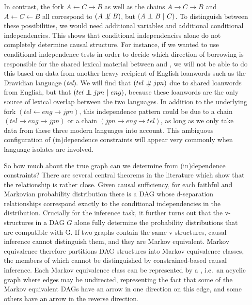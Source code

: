 In contrast, the fork $A \leftarrow C \rightarrow B$ as well as the chains $A \rightarrow C \rightarrow B$ and $A \leftarrow C \leftarrow B$ all correspond to  $(A \notindep B)$, but $(A \independent B\ |\ C)$. To distinguish between these possibilities, we would need additional variables and additional conditional independencies. This shows that conditional independencies alone do not completely determine causal structure. For instance, if we wanted to use conditional independence tests in order to decide which direction of borrowing is responsible for the shared lexical material between  and , we will not be able to do this based on data from another heavy recipient of English loanwords such as the Dravidian language  (\textit{tel}). We will find that $(tel \notindep jpn)$ due to shared loanwords from English, but that $(tel \independent jpn\ |\ eng)$, because these loanwords are the only source of lexical overlap between the two languages. In addition to the 
underlying fork $(tel \leftarrow eng \rightarrow jpn)$, this independence pattern could be due to a chain $(tel \rightarrow eng \rightarrow jpn)$ or a chain $(jpn \rightarrow eng \rightarrow tel)$, as long as we only take data from these three modern languages into account. This ambiguous configuration of (in)dependence constraints will appear very commonly when language isolates are involved.

So how much about the true graph can we determine from (in)dependence constraints? There are several central theorems in the literature which show that the relationship is rather close. Given causal sufficiency, for each faithful and Markovian probability distribution there is a DAG whose d-separation relationships correspond exactly to the conditional independencies in the distribution. Crucially for the inference task, it further turns out that the v-structures in a DAG $G$ alone fully determine the probability distributions that are compatible with G. If two graphs contain the same v-structures, causal inference cannot distinguish them, and they are Markov equivalent. Markov equivalence therefore partitions DAG structures into Markov equivalence classes, the members of which cannot be distinguished by constrained-based causal inference. Each Markov equivalence class can be represented by a \textit{}, i.e.\ an acyclic graph where edges may be undirected, representing the fact that some of the Markov equivalent DAGs have an arrow in one direction on this edge, and some others have an arrow in the reverse direction.

